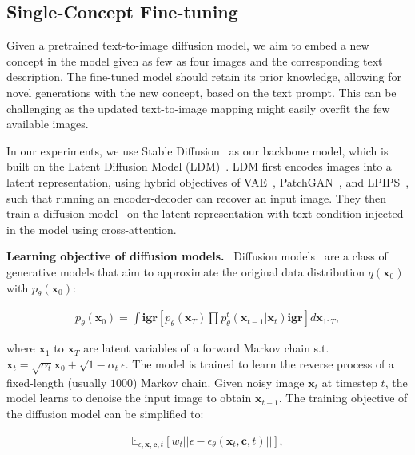 \subsection{Single-Concept Fine-tuning}\label{sec:single_concept}

Given a pretrained text-to-image diffusion model, we aim to embed a new concept in the model given as few as four images and the corresponding text description. The fine-tuned model should retain its prior knowledge, allowing for novel generations with the new concept, based on the text prompt. This can be challenging as the updated text-to-image mapping might easily overfit the few available images. 

In our experiments, we use Stable Diffusion~\cite{stablediffusionlink} as our backbone model, which is built on the Latent Diffusion Model (LDM)~\cite{rombach2022high}. LDM first encodes images into a latent representation, using hybrid objectives of VAE~\cite{kingma2013auto}, PatchGAN~\cite{isola2017image}, and LPIPS~\cite{zhang2018unreasonable}, such that running an encoder-decoder can recover an input image. They then train a diffusion model~\cite{ho2020denoising} on the latent representation with text condition injected in the model using cross-attention. 

  \textbf{Learning objective of diffusion models.} \ 
Diffusion models~\cite{sohl2015deep,ho2020denoising} are a class of generative models that aim to approximate the original data distribution $q({\mathbf{x}}_0)$ with $p_\theta({\mathbf{x}}_0)$:

\begin{equation}
    \begin{aligned}
    p_\theta({\mathbf{x}}_0) 
    = \int \mathbf{igr} [ p_{\theta} ({\mathbf{x}}_{T}) \prod p_{\theta}^t({\mathbf{x}}_{t-1} | {\mathbf{x}}_t) \mathbf{igr} ] d{\mathbf{x}}_{1:T}, 
    \end{aligned}
\end{equation}

where ${\mathbf{x}}_1$ to ${\mathbf{x}}_T$ are latent variables of a forward Markov chain s.t. ${\mathbf{x}}_{t} = \sqrt{\alpha_t}{\mathbf{x}}_{0} + \sqrt{1 - \alpha_t}\epsilon$. The model is trained to learn the reverse process of a fixed-length (usually $1000$) Markov chain. Given noisy image ${\mathbf{x}}_{t}$ at timestep $t$, the model learns to denoise the input image to obtain ${\mathbf{x}}_{t-1}$. The training objective of the diffusion model can be simplified to:

\begin{equation}
    \begin{aligned}
     \mathbb{E}_{\epsilon,{\mathbf{x}},{\mathbf{c}}, t } [w_t||\epsilon - \epsilon_{\theta} ({\mathbf{x}}_t, {\mathbf{c}}, t) ||], \\
    \end{aligned}\label{eq:loss}
\end{equation}

